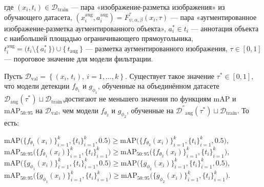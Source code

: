 где $(x_i, t_i) \in \mathcal{D}_{\mathrm{train}}$ — пара «изображение-разметка изображения» из обучающего датасета,
$(x_i^{\mathrm{aug}}, a_i^{\mathrm{aug}}) = F^{''}_{\psi,\alpha,\beta}(x_i, \tau)$ — пара «аугментированное изображение-разметка аугментированного объекта»,
$a_i^* \in t_i$ — аннотация объекта с наибольшей площадью ограничивающего прямоугольника,
$t_i^{\mathrm{aug}} = \bigl(t_i \setminus \{\,a_i^*\,\}\bigr) \cup \{\,t_{\mathrm{aug}}\,\}$ — разметка аугментированного изображения,
$\tau \in [0,1]$ — пороговое значение для модели фильтрации.
\begin{statement3}
Пусть $\mathcal{D}_{\text{val}} =
\left\{
  (x_i,\,t_i), \
  i = 1,\dots,k
\right\}$. Существует такое значение $\tau^*\in[0,1]$, что модели детекции $f_{\theta_1}$ и $g_{\phi_1}$, обученные на объединённом датасете $\mathcal{D}_{\mathrm{aug}}(\tau^*)\sqcup\mathcal{D}_{\mathrm{train}}$,достигают не меньшего значения по функциям $\mathrm{mAP}$ и $\mathrm{mAP}_{50:95}$ на $\mathcal{D}_{\text{val}}$, чем модели $f_{\theta_2}$ и $g_{\phi_2}$, обученные на $\mathcal{D^{''}}_{\text{aug}}(\tau^{*}) \sqcup \mathcal{D}_{\text{train}}$. То есть:
\begin{center}
$\mathrm{mAP}\bigl(\{f_{\theta_1}(x_i)\}_{i=1}^k,\{t_i\}_{i=1}^k,0.5\bigr)\ge\mathrm{mAP}\bigl(\{f_{\theta_2}(x_i)\}_{i=1}^k,\{t_i\}_{i=1}^k,0.5\bigr)$,  
$\mathrm{mAP}_{50:95}\bigl(\{f_{\theta_1}(x_i)\}_{i=1}^k,\{t_i\}_{i=1}^k\bigr)\ge\mathrm{mAP}_{50:95}\bigl(\{f_{\theta_2}(x_i)\}_{i=1}^k,\{t_i\}_{i=1}^k\bigr)$,  
$\mathrm{mAP}\bigl(\{g_{\phi_1}(x_i)\}_{i=1}^k,\{t_i\}_{i=1}^k,0.5\bigr)\ge\mathrm{mAP}\bigl(\{g_{\phi_2}(x_i)\}_{i=1}^k,\{t_i\}_{i=1}^k,0.5\bigr)$,  
$\mathrm{mAP}_{50:95}\bigl(\{g_{\phi_1}(x_i)\}_{i=1}^k,\{t_i\}_{i=1}^k\bigr)\ge\mathrm{mAP}_{50:95}\bigl(\{g_{\phi_2}(x_i)\}_{i=1}^k,\{t_i\}_{i=1}^k\bigr)$.
\end{center}
\
\end{statement3}






